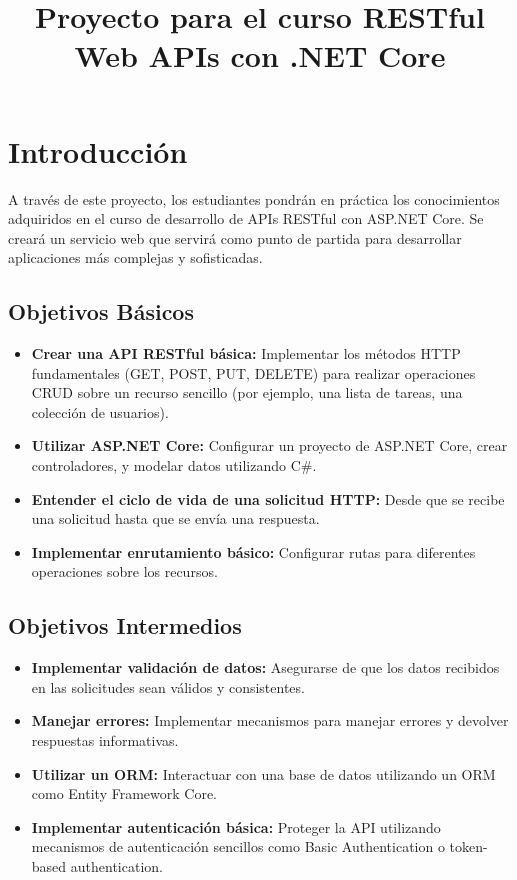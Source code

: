 \documentclass[
]{agujournal2019}
\providecommand{\tightlist}{%
  \setlength{\itemsep}{0pt}\setlength{\parskip}{0pt}}\usepackage{longtable,booktabs,array}
\begin{document}
\title{Proyecto para el curso RESTful Web APIs con .NET Core}









\section{Introducción}\label{introducciuxf3n}

A través de este proyecto, los estudiantes pondrán en práctica los
conocimientos adquiridos en el curso de desarrollo de APIs RESTful con
ASP.NET Core. Se creará un servicio web que servirá como punto de
partida para desarrollar aplicaciones más complejas y sofisticadas.

\subsection{Objetivos Básicos}\label{objetivos-buxe1sicos}

\begin{itemize}
\tightlist
\item
  \textbf{Crear una API RESTful básica:} Implementar los métodos HTTP
  fundamentales (GET, POST, PUT, DELETE) para realizar operaciones CRUD
  sobre un recurso sencillo (por ejemplo, una lista de tareas, una
  colección de usuarios).
\item
  \textbf{Utilizar ASP.NET Core:} Configurar un proyecto de ASP.NET
  Core, crear controladores, y modelar datos utilizando C\#.
\item
  \textbf{Entender el ciclo de vida de una solicitud HTTP:} Desde que se
  recibe una solicitud hasta que se envía una respuesta.
\item
  \textbf{Implementar enrutamiento básico:} Configurar rutas para
  diferentes operaciones sobre los recursos.
\end{itemize}

\subsection{Objetivos Intermedios}\label{objetivos-intermedios}

\begin{itemize}
\tightlist
\item
  \textbf{Implementar validación de datos:} Asegurarse de que los datos
  recibidos en las solicitudes sean válidos y consistentes.
\item
  \textbf{Manejar errores:} Implementar mecanismos para manejar errores
  y devolver respuestas informativas.
\item
  \textbf{Utilizar un ORM:} Interactuar con una base de datos utilizando
  un ORM como Entity Framework Core.
\item
  \textbf{Implementar autenticación básica:} Proteger la API utilizando
  mecanismos de autenticación sencillos como Basic Authentication o
  token-based authentication.
\end{itemize}
\end{document}
